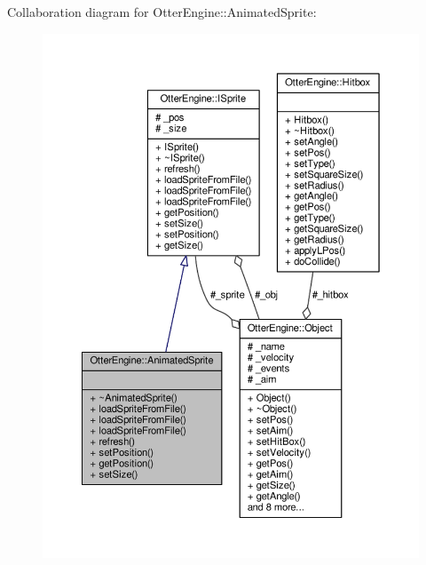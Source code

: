 Collaboration diagram for Otter\+Engine\+:\+:Animated\+Sprite\+:\nopagebreak
\begin{figure}[H]
\begin{center}
\leavevmode
\includegraphics[width=350pt]{df/dae/class_otter_engine_1_1_animated_sprite__coll__graph}
\end{center}
\end{figure}
